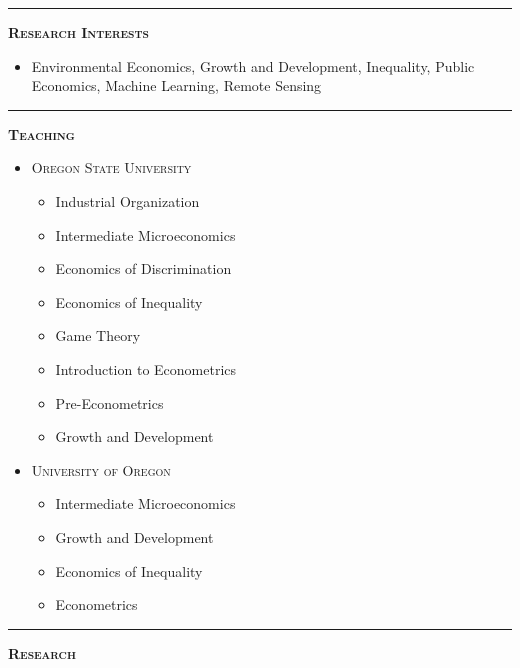 \documentclass[12pt]{article}
\begin{document}
\hrule
\bigskip 
\noindent \textsc{\large \textbf{Research Interests}}

\begin{itemize}
\item[] Environmental Economics, Growth and Development, Inequality, Public Economics, Machine Learning, Remote Sensing 
\end{itemize}




\bigskip
\hrule
\bigskip 
\noindent \textsc{\large \textbf{Teaching}}

\begin{itemize}
\item[] \textsc{Oregon State University}
  \begin{itemize}[topsep=-1em, noitemsep]
    \item Industrial Organization
\item[] Intermediate Microeconomics%
\item[] Economics of Discrimination%
\item[] Economics of Inequality%
\item[] Game Theory%
\item[] Introduction to Econometrics%
\item[] Pre-Econometrics%
\item[] Growth and Development
\end{itemize}

\newpage

\item[] \textsc{University of Oregon}
\begin{itemize}[topsep=-1em, noitemsep]
\item[] Intermediate Microeconomics%
\item[] Growth and Development%
\item[] Economics of Inequality%
\item[] Econometrics%
\end{itemize}

\end{itemize}

\bigskip
\hrule
\bigskip 
\noindent \textsc{\large \textbf{Research}}
\end{document}
